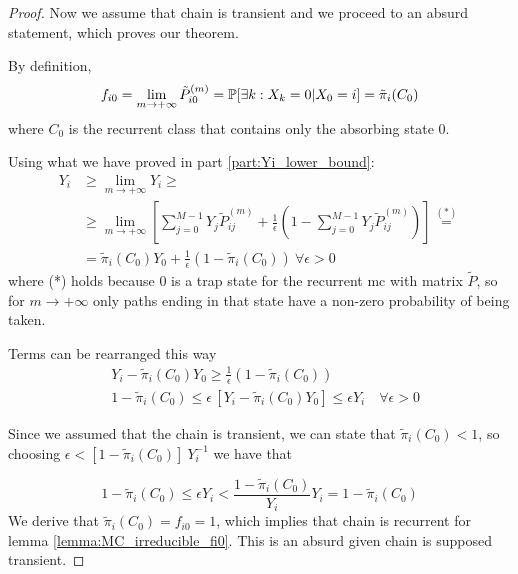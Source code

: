 \begin{proof}
		\proofpart
			Now we assume that chain is transient and we proceed to an absurd statement, which proves our theorem.

			By definition,
			$$ f_{i0} = \lim_{m \to +\infty} \tilde{P}_{i0}^{(m)} = \mathbb{P}[\exists k : X_k = 0 | X_0 = i] = \tilde{\pi}_i(C_0)$$
			where $C_0$ is the recurrent class that contains only the absorbing state 0.

			Using what we have proved in part \ref{part:Yi_lower_bound}:
			\begin{equation}\begin{split}
				Y_i & \ge \lim_{m \to +\infty} Y_i \ge \\
					& \ge \lim_{m \to +\infty} \left[ \sum_{j=0}^{M-1} Y_j \tilde{P}_{ij}^{(m)}
						+ \frac{1}{\epsilon} \left( 1 - \sum_{j=0}^{M-1} Y_j \tilde{P}_{ij}^{(m)} \right) \right] \stackrel{(*)}{=} \\
				& = \tilde{\pi}_i(C_0) Y_0 + \frac{1}{\epsilon} \left( 1 - \tilde{\pi}_i(C_0) \right) ~ \forall \epsilon > 0
			\end{split}\end{equation}
			where (*) holds because 0 is a trap state for the recurrent \gls{mc} with matrix  $\tilde{P}$, so for $m \to +\infty$ only paths ending in that state have a non-zero probability of being taken.

			Terms can be rearranged this way
			\begin{equation*}\begin{split}
				&Y_i - \tilde{\pi}_i(C_0) Y_0 \ge \frac{1}{\epsilon} \left( 1 - \tilde{\pi}_i(C_0) \right) \\
				&1 - \tilde{\pi}_i(C_0) \le \epsilon \, [Y_i - \tilde{\pi}_i(C_0) Y_0] \le \epsilon Y_i \quad\forall \epsilon > 0
			\end{split}\end{equation*}

			Since we assumed that the chain is transient, we can state that $\tilde{\pi}_i(C_0) < 1$, so choosing $\epsilon < [1-\tilde{\pi}_i(C_0)] ~ Y_i^{-1}$ we have that

			\begin{equation*}
				1 - \tilde{\pi}_i(C_0) \le \epsilon Y_i < \frac{1-\tilde{\pi}_i(C_0)}{Y_i} Y_i = 1 - \tilde{\pi}_i(C_0)
			\end{equation*}
			We derive that $\tilde{\pi}_i(C_0) = f_{i0} = 1$, which implies that chain is recurrent for lemma \ref{lemma:MC_irreducible_fi0}. This is an absurd given chain is supposed transient.
	\end{proof}
